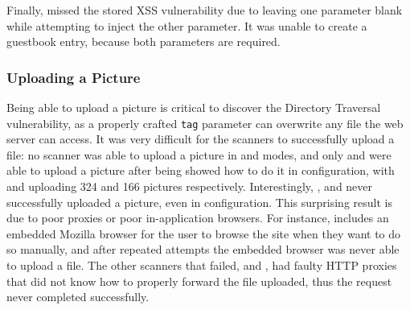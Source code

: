 Finally, \waf{} missed the stored XSS vulnerability due to leaving one parameter blank
while attempting to inject the other parameter. It was unable to create a
guestbook entry, because both parameters are required. 


% 
\subsubsection{Uploading a Picture}
\label{picture-creation}
Being able to upload a picture is critical to discover the
Directory Traversal vulnerability, as a properly crafted {\tt tag} parameter
can overwrite any file the web server can access. 
It was very difficult for the scanners to successfully upload a file:
no scanner was able to upload a picture in \initial{} and \config{} modes,
and only \appscan{} and \webinspect{} were able to upload a picture
after being showed how to do it in \manual{}
configuration, with \appscan{} and \webinspect{} uploading 324 and 166
pictures respectively. Interestingly, \hailstorm{}, \nstalker{} and
\ntospider{} never successfully 
uploaded a picture, even in \manual{} configuration. This surprising result is
due to poor proxies or poor in-application browsers. For instance, \hailstorm{}
includes an embedded Mozilla browser for the user to browse the site when they
want to do so manually, and after repeated attempts the embedded browser
was never able to upload a file. The other scanners that failed, \nstalker{} and
\ntospider{}, had faulty HTTP proxies
that did not know how to properly forward the file uploaded, thus the request
never completed successfully. 

